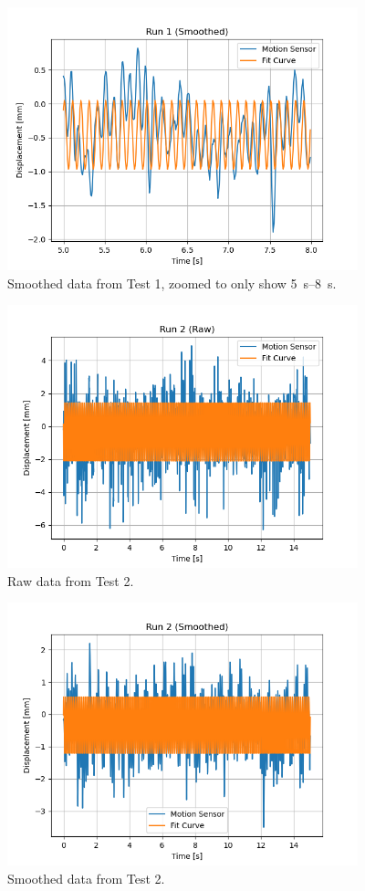 \documentclass[12 pt]{report}
\begin{document}
\begin{figure}[htbp]
\centering
\includegraphics[width=4in]{images/Graphs/Run_1-Smoothed-Zoomed}
\caption{Smoothed data from Test \num{1}, zoomed to only show \qtyrange{5}{8}{\s}.}
\end{figure}


\begin{figure}[htbp]
\centering
\includegraphics[width=4in]{images/Graphs/Run_2-Raw}
\caption{Raw data from Test \num{2}.}
\end{figure}

\begin{figure}[htbp]
\centering
\includegraphics[width=4in]{images/Graphs/Run_2-Smoothed}
\caption{Smoothed data from Test \num{2}.}
\end{figure}
\end{document}
